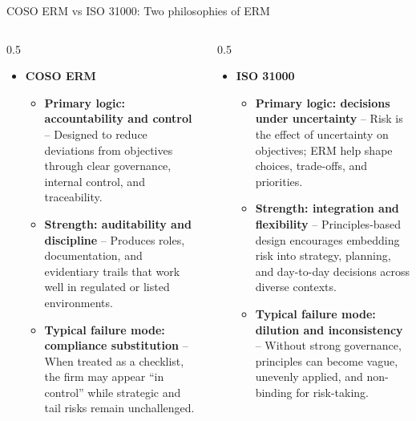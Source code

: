 \documentclass[aspectratio=169, 10pt]{beamer} %
\begin{document}
\begin{frame}{COSO ERM vs ISO 31000: Two philosophies of ERM}

\begin{columns}[T,onlytextwidth]

\begin{column}{0.5\textwidth}
    \begin{itemize}
  \item[$\bullet$]  \textbf{COSO ERM}

\begin{itemize}
  \item[$\bullet$] \textbf{Primary logic: accountability and control} --
  Designed to reduce deviations from objectives through clear governance,
  internal control, and traceability.

  \item[$\bullet$] \textbf{Strength: auditability and discipline} --
  Produces roles, documentation, and evidentiary trails that work well in
  regulated or listed environments.

  \item[$\bullet$] \textbf{Typical failure mode: compliance substitution} --
  When treated as a checklist, the firm may appear ``in control'' while
  strategic and tail risks remain unchallenged.
\end{itemize}
    \end{itemize}

\end{column}

\begin{column}{0.5\textwidth}
        \begin{itemize}
\item \textbf{ISO 31000}

\begin{itemize}
  \item[$\bullet$] \textbf{Primary logic: decisions under uncertainty} --
  Risk is the effect of uncertainty on objectives; ERM help shape choices, trade-offs, and priorities.

  \item[$\bullet$] \textbf{Strength: integration and flexibility} --
  Principles-based design encourages embedding risk into strategy, planning,
  and day-to-day decisions across diverse contexts.

  \item[$\bullet$] \textbf{Typical failure mode: dilution and inconsistency} --
  Without strong governance, principles can become vague, unevenly applied,
  and non-binding for risk-taking.
\end{itemize}
    \end{itemize}
\end{column}


\end{columns}
\end{frame}
\end{document}
